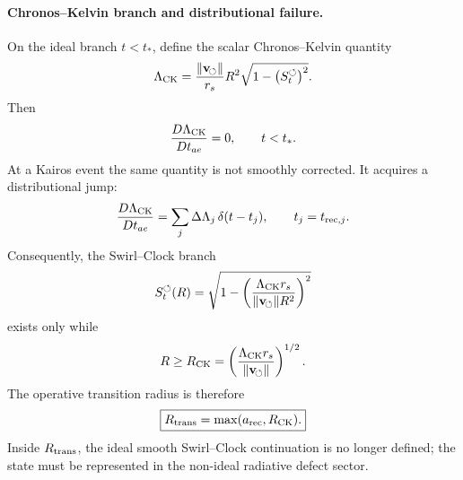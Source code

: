 \paragraph{Chronos--Kelvin branch and distributional failure.}
On the ideal branch $t<t_\ast$, define the scalar Chronos--Kelvin quantity
\begin{equation}
    \Lambda_{\rm CK}
    =
    \frac{\lVert\mathbf{v}_{\!\boldsymbol{\circlearrowleft}}\rVert}{r_s}R^2
    \sqrt{1-\left(S_t^{\boldsymbol{\circlearrowleft}}\right)^2}.
    \label{eq:sst_lambda_ck_hitting}
\end{equation}
Then
\begin{equation}
    \frac{D\Lambda_{\rm CK}}{Dt_{ae}}=0,
    \qquad t<t_\ast.
    \label{eq:sst_lambda_ck_conserved_before_hit}
\end{equation}
At a Kairos event the same quantity is not smoothly corrected. It acquires a distributional jump:
\begin{equation}
    \frac{D\Lambda_{\rm CK}}{Dt_{ae}}
    =
    \sum_j \Delta\Lambda_j\,\delta(t-t_j),
    \qquad t_j=t_{{\rm rec},j}.
    \label{eq:sst_lambda_ck_distributional_jump}
\end{equation}
Consequently, the Swirl--Clock branch
\begin{equation}
    S_t^{\boldsymbol{\circlearrowleft}}(R)
    =
    \sqrt{1-
    \left(
        \frac{\Lambda_{\rm CK}r_s}{\lVert\mathbf{v}_{\!\boldsymbol{\circlearrowleft}}\rVert R^2}
    \right)^2}
    \label{eq:sst_swirl_clock_branch_hitting}
\end{equation}
exists only while
\begin{equation}
    R\ge R_{\rm CK}
    =
    \left(\frac{\Lambda_{\rm CK}r_s}{\lVert\mathbf{v}_{\!\boldsymbol{\circlearrowleft}}\rVert}\right)^{1/2}.
    \label{eq:sst_ck_radius_bound}
\end{equation}
The operative transition radius is therefore
\begin{equation}
    \boxed{
    R_{\rm trans}=\max(a_{\rm rec},R_{\rm CK}).
    }
    \label{eq:sst_transition_radius_max}
\end{equation}
Inside $R_{\rm trans}$, the ideal smooth Swirl--Clock continuation is no longer defined; the state must be represented in the non-ideal radiative defect sector.

